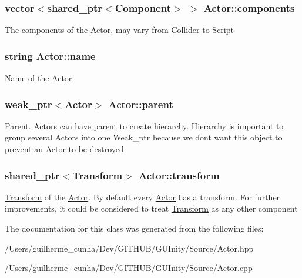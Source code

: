 \subsubsection[{components}]{\setlength{\rightskip}{0pt plus 5cm}vector$<$shared\+\_\+ptr$<${\bf Component}$>$ $>$ Actor\+::components}\label{class_actor_afb92b26e5696d81dd5b512c2e41c00ea}
The components of the \hyperlink{class_actor}{Actor}, may vary from \hyperlink{class_collider}{Collider} to Script \hypertarget{class_actor_adc0a0fe742f4bd972168f8ef7ad55e8f}{}
\subsubsection[{name}]{\setlength{\rightskip}{0pt plus 5cm}string Actor\+::name}\label{class_actor_adc0a0fe742f4bd972168f8ef7ad55e8f}
Name of the \hyperlink{class_actor}{Actor} \hypertarget{class_actor_abb76f1796e97a76079f4d181f7fd1088}{}
\subsubsection[{parent}]{\setlength{\rightskip}{0pt plus 5cm}weak\+\_\+ptr$<${\bf Actor}$>$ Actor\+::parent}\label{class_actor_abb76f1796e97a76079f4d181f7fd1088}
Parent. Actors can have parent to create hierarchy. Hierarchy is important to group several Actors into one Weak\+\_\+ptr because we don\textquotesingle{}t want this object to prevent an \hyperlink{class_actor}{Actor} to be destroyed \hypertarget{class_actor_a9b100f35016ff90eb2ff60ae39566a26}{}
\subsubsection[{transform}]{\setlength{\rightskip}{0pt plus 5cm}shared\+\_\+ptr$<${\bf Transform}$>$ Actor\+::transform}\label{class_actor_a9b100f35016ff90eb2ff60ae39566a26}
\hyperlink{class_transform}{Transform} of the \hyperlink{class_actor}{Actor}. By default every \hyperlink{class_actor}{Actor} has a transform. For further improvements, it could be considered to treat \hyperlink{class_transform}{Transform} as any other component 

The documentation for this class was generated from the following files\+:\begin{DoxyCompactItemize}
\item 
/\+Users/guilherme\+\_\+cunha/\+Dev/\+G\+I\+T\+H\+U\+B/\+G\+U\+Inity/\+Source/Actor.\+hpp\item 
/\+Users/guilherme\+\_\+cunha/\+Dev/\+G\+I\+T\+H\+U\+B/\+G\+U\+Inity/\+Source/Actor.\+cpp\end{DoxyCompactItemize}
